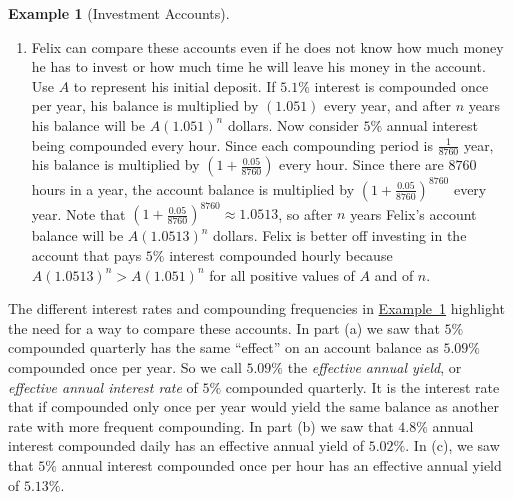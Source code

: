 \documentclass[10pt,]{book}
\theoremstyle{plain}
\theoremstyle{definition}
\theoremstyle{definition}
\newtheorem{example}[theorem]{Example}
\theoremstyle{definition}
\numberwithin{equation}{section}
\begin{document}
\begin{example}[Investment Accounts]
\begin{enumerate}
\item\hypertarget{li-103}{}Felix can compare these accounts even if he does not know how much money he has to invest or how much time he will leave his money in the account.  Use \(A\) to represent his initial deposit.  If \(5.1\%\) interest is compounded once per year, his balance is multiplied by \((1.051)\) every year, and after \(n\) years his balance will be \(A(1.051)^n\) dollars. Now consider \(5\%\) annual interest being compounded every hour.  Since each compounding period is \(\frac{1}{8760}\) year, his balance is multiplied by \((1+\frac{0.05}{8760})\) every hour. Since there are \(8760\) hours in a year, the account balance is multiplied by \((1+\frac{0.05}{8760})^{8760}\) every year. Note that \((1 + \frac{0.05}{8760} )^{8760} \approx 1.0513\), so after \(n\) years Felix’s account balance will be \(A(1.0513)^n\) dollars. Felix is better off investing in the account that pays \(5\%\) interest compounded hourly because \(A(1.0513)^n > A(1.051)^n\) for all positive values of \(A\) and of \(n\).%
\end{enumerate}
\end{example}
\hypertarget{p-205}{}%
The different interest rates and compounding frequencies in \hyperref[chapter04-section05-investment-accounts]{Example~1} highlight the need for a way to compare these accounts. In part (a) we saw that \(5\%\) compounded quarterly has the same “effect” on an account balance as \(5.09\%\) compounded once per year. So we call \(5.09\%\) the \emph{effective annual yield}, or \emph{effective annual interest rate} of \(5\%\) compounded quarterly.  It is the interest rate that if compounded only once per year would yield the same balance as another rate with more frequent compounding. In part (b) we saw that \(4.8\%\) annual interest compounded daily has an effective annual yield of \(5.02\%\). In (c), we saw that \(5\%\) annual interest compounded once per hour has an effective annual yield of \(5.13\%\).%
\typeout{************************************************}
\typeout{************************************************}
\end{document}
